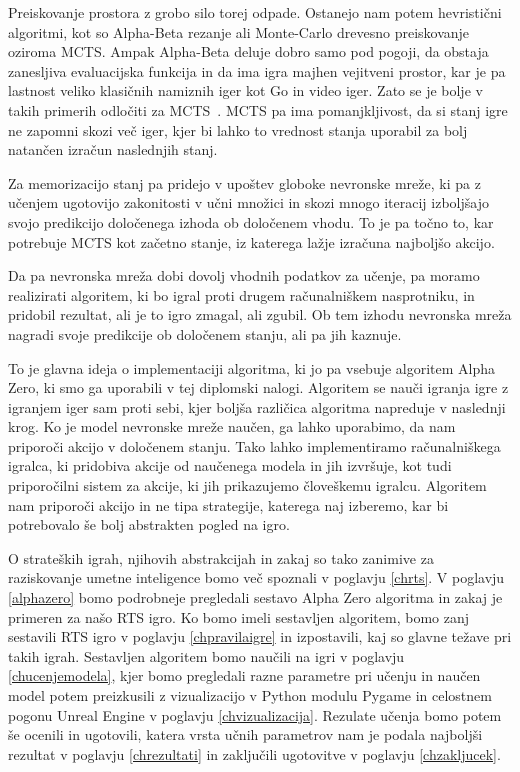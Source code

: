 \documentclass[a4paper, 12pt]{book}
\begin{document}
Preiskovanje prostora z grobo silo torej odpade. 
Ostanejo nam potem hevristični algoritmi, kot so Alpha-Beta rezanje ali Monte-Carlo drevesno preiskovanje oziroma MCTS. 
Ampak Alpha-Beta deluje dobro samo pod pogoji, da obstaja zanesljiva evaluacijska funkcija in da ima igra majhen vejitveni prostor, kar je pa lastnost veliko klasičnih namiznih iger kot Go in video iger. Zato se je bolje v takih primerih odločiti za MCTS~\cite{chaslot2008monte}.
MCTS pa ima pomanjkljivost, da si stanj igre ne zapomni skozi več iger, kjer bi lahko to vrednost stanja uporabil za bolj natančen izračun naslednjih stanj.

Za memorizacijo stanj pa pridejo v upoštev globoke nevronske mreže, ki pa z učenjem ugotovijo zakonitosti v učni množici in skozi mnogo iteracij izboljšajo svojo predikcijo določenega izhoda ob določenem vhodu. To je pa točno to, kar potrebuje MCTS kot začetno stanje, iz katerega lažje izračuna najboljšo akcijo.

Da pa nevronska mreža dobi dovolj vhodnih podatkov za učenje, pa moramo realizirati algoritem, ki bo igral proti drugem računalniškem nasprotniku, in pridobil rezultat, ali je to igro zmagal, ali zgubil. 
Ob tem izhodu nevronska mreža nagradi svoje predikcije ob določenem stanju, ali pa jih kaznuje.

To je glavna ideja o implementaciji algoritma, ki jo pa vsebuje algoritem Alpha Zero, ki smo ga uporabili v tej diplomski nalogi.
Algoritem se nauči igranja igre z igranjem iger sam proti sebi, kjer boljša različica algoritma napreduje v naslednji krog.
Ko je model nevronske mreže naučen, ga lahko uporabimo, da nam priporoči akcijo v določenem stanju.
Tako lahko implementiramo računalniškega igralca, ki pridobiva akcije od naučenega modela in jih izvršuje, kot tudi priporočilni sistem za akcije, ki jih prikazujemo človeškemu igralcu. Algoritem nam priporoči akcijo in ne tipa strategije, katerega naj izberemo, kar bi potrebovalo še bolj abstrakten pogled na igro. 

O strateških igrah, njihovih abstrakcijah in zakaj so tako zanimive za raziskovanje umetne inteligence bomo več spoznali v poglavju \ref{chrts}.
V poglavju \ref{alphazero} bomo podrobneje pregledali sestavo Alpha Zero algoritma in zakaj je primeren za našo RTS igro.
Ko bomo imeli sestavljen algoritem, bomo zanj sestavili RTS igro v poglavju \ref{chpravilaigre} in izpostavili, kaj so glavne težave pri takih igrah.
Sestavljen algoritem bomo naučili na igri v poglavju \ref{chucenjemodela}, kjer bomo pregledali razne parametre pri učenju in naučen model potem preizkusili z vizualizacijo v Python modulu Pygame in celostnem pogonu Unreal Engine v poglavju \ref{chvizualizacija}.
Rezulate učenja bomo potem še ocenili in ugotovili, katera vrsta učnih parametrov nam je podala najboljši rezultat v poglavju \ref{chrezultati} in zaključili ugotovitve v poglavju \ref{chzakljucek}.
\end{document}

